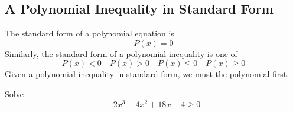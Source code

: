 \subsection{A Polynomial Inequality in Standard Form} 
The standard form of a polynomial equation is
\[
P(x)=0
\]
Similarly, the standard form of a polynomial inequality is one of
\[
P(x)<0
\quad
P(x)>0
\quad
P(x)\leq 0
\quad
P(x)\geq 0
\]
Given a polynomial inequality in standard form, we must \makeblank[1.5in] the polynomial first.
\begin{Example}
Solve
\[
-2x^3-4x^2+18x-4\geq 0
\]
\fillpaper
\end{Example}